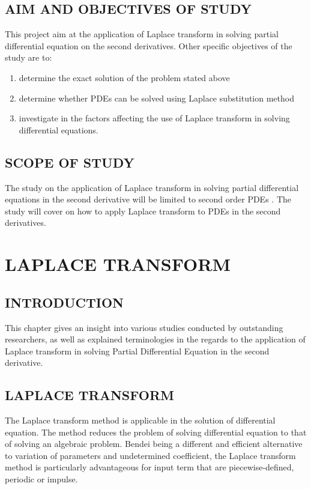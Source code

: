 \documentclass[11pt]{report}
\newcommand{\PDe}{Partial Differential Equation }
\newcommand{\PDEs}{PDEs }
\begin{document}
	\section{AIM AND OBJECTIVES OF STUDY}
	This project aim at the application of Laplace transform in solving partial differential equation on the second derivatives. Other specific objectives of the study are to:
	\begin{enumerate}
		\item determine the exact solution of the problem stated above
		\item determine whether \PDEs can be solved using Laplace substitution method
		\item investigate in the factors affecting the use of Laplace transform in solving differential equations.
	\end{enumerate}

	\section{SCOPE OF STUDY}
	The study on the application of Laplace transform in solving partial differential equations in the second derivative will be limited to second order \PDEs. The study will cover on how to apply Laplace transform to \PDEs in the second derivatives. 
	
	
	\chapter{LAPLACE TRANSFORM}
	\section{INTRODUCTION}
	This chapter gives an insight into various studies conducted by outstanding researchers, as well as explained terminologies in the regards to the application of Laplace transform in solving \PDe in the second derivative.
	
	\section{LAPLACE TRANSFORM}
	The Laplace transform method is applicable in the solution of differential equation. The method reduces the problem of solving differential equation to that of solving an algebraic problem.  Bendei being a different and efficient alternative to variation of parameters and undetermined coefficient, the Laplace transform method is particularly advantageous for input term that are piecewise-defined, periodic or impulse.
	
\end{document}
